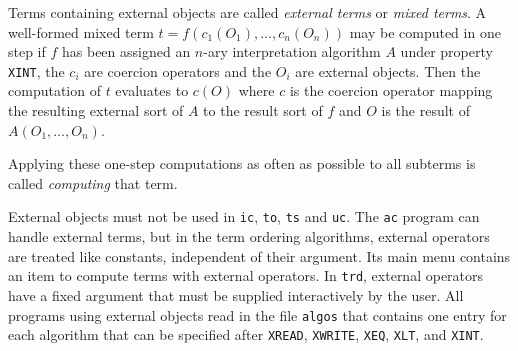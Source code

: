 Terms containing external objects are called
{\em external terms} or {\em mixed terms}.
A well-formed mixed term \(t=f(c_1(O_1),\ldots, c_n(O_n))\) 
may be computed in one step if \(f\) has been assigned an \(n\)-ary
interpretation algorithm \(A\)
under property {\tt XINT}, the \(c_i\) are coercion operators and the
\(O_i\) are external objects.
Then the computation of \(t\) evaluates to $c(O)$ where $c$ is the
coercion operator mapping the resulting external sort of $A$ to the
result sort of $f$ and $O$ is the result of 
\(A(O_1,\ldots,O_n)\).

Applying these one-step computations as often as possible to all
subterms is called {\em computing} that term.

External objects must not be used in {\tt ic}, {\tt to}, {\tt ts}
and {\tt uc}.
The {\tt ac} program can handle external terms, but in the term ordering
algorithms, external operators
are treated like constants, independent of their argument. Its
main menu contains an item to compute terms with external operators.
In {\tt trd}, external operators have a fixed argument that
must be supplied interactively by the user.
All programs using external objects read in the file {\tt algos}
that contains one entry for each algorithm that can be specified
after {\tt XREAD}, {\tt XWRITE}, {\tt XEQ}, {\tt XLT}, and {\tt XINT}.


